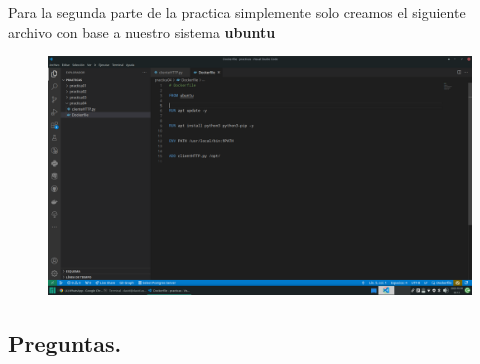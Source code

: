 \documentclass[14pt]{book}
\begin{document}
Para la segunda parte de la practica simplemente solo creamos el siguiente archivo con base a nuestro sistema \textbf{ubuntu}\\

\begin{figure}[h]
  \centering
  \includegraphics[width=15cm]{images/dockerg.png}
\end{figure}

{\color{blue} \subsection*{\textbf{Preguntas.}}}
\vspace{1em}
\end{document}

